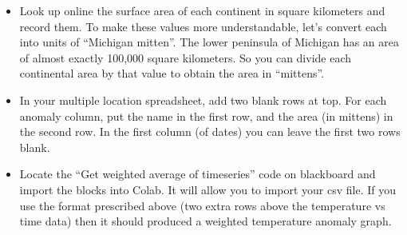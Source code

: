 	\begin{itemize}
	\item Look up online the surface area of each continent in square kilometers and record them.  To make these values more understandable, let's convert each into units of ``Michigan mitten''. The lower peninsula of Michigan has an area of almost exactly 100,000 square kilometers.  So you can divide each continental area by that value to obtain the area in ``mittens''.  
	\item In your multiple location spreadsheet, add two blank rows at top.  For each anomaly column, put the name in the first row, and the area (in mittens) in the second row.  In the first column (of dates) you can leave the first two rows blank.
	\item Locate the ``Get weighted average of timeseries'' code on blackboard and import the blocks into Colab.  It will allow you to import your csv file. If you use the format prescribed above (two extra rows above the temperature vs time data) then it should produced a weighted temperature anomaly graph.
	\end{itemize}





 